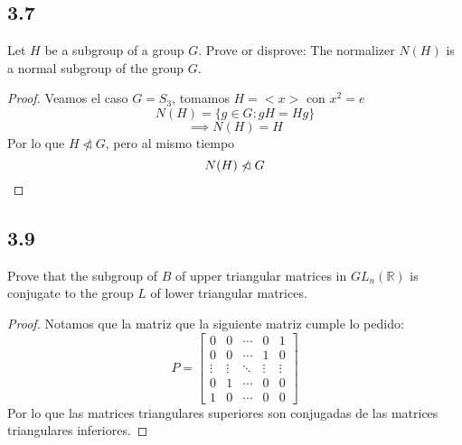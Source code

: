 \documentclass[11pt]{article}
\newcommand{\set}[1]{\mathbb{#1}}
\theoremstyle{definition}
\begin{document}
        \subsection{3.7}
        Let $H$ be a subgroup of a group $G$. Prove or disprove: The normalizer $N(H)$ is a normal subgroup of the group $G$.
        \begin{proof}
            Veamos el caso $G=S_3$, tomamos $H=<x>$ con $x^2=e$
            \[N(H)=\{g\in G:gH=Hg\}\]
            \[\implies N(H)=H\]
            Por lo que $H\ntriangleleft G$, pero al mismo tiempo
            \[N(H)\ntriangleleft G\qedhere\]
        \end{proof}
        \subsection{3.9}
        Prove that the subgroup of $B$ of upper triangular matrices in $GL_n(\set{R})$ is conjugate to the group $L$ of lower triangular matrices.
        \begin{proof}
            Notamos que la matriz que la siguiente matriz cumple lo pedido:
            \[P=\begin{bmatrix}
                0 & 0 & \cdots & 0 & 1\\
                0 & 0 & \cdots & 1 & 0\\
                \vdots & \vdots & \ddots & \vdots & \vdots\\
                0 & 1 & \cdots & 0 & 0\\
                1 & 0 & \cdots & 0 & 0
            \end{bmatrix}\]
            Por lo que las matrices triangulares superiores son conjugadas de las matrices triangulares inferiores.
        \end{proof}
\end{document}
